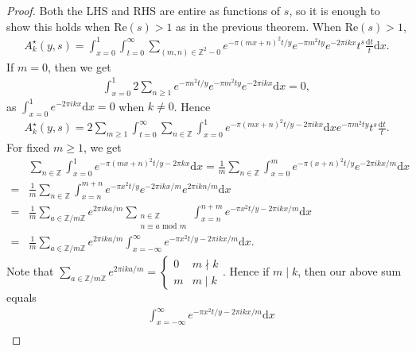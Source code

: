 \documentclass{article}
\theoremstyle{definition}
\begin{document}
\begin{proof}
    Both the LHS and RHS are entire as functions of $s$, so it is enough to show this holds when $\text{Re}(s)>1$ as in the previous theorem. When $\text{Re}(s)>1$, \begin{align*}
        A_k^{\star}(y,s) = \int_{x=0}^{1} \int_{t=0}^{\infty} \sum_{(m,n) \in \mathbb{Z}^2-0}^{} e^{-\pi(mx+n)^2 t/y}e^{-\pi m^2 t y} e^{-2\pi i k x}t^s \frac{\mathrm{d}t}{t}\mathrm{d}x.
    \end{align*}
    If $m=0$, then we get
    \begin{align*}
        \int_{x=0}^{1} 2\sum_{n\ge 1}^{} e^{-\pi n^2 t/y}e^{-\pi m^2 t y}e^{-2\pi i k x}\mathrm{d}x = 0,
    \end{align*}
    as $\int_{x=0}^{1} e^{-2 \pi i k x}\mathrm{d}x = 0$ when $k \neq 0$. Hence
    \begin{align*}
        A_k^{\star}(y,s) = 2 \sum_{m\ge 1}^{} \int_{t=0}^{\infty} \sum_{n \in \mathbb{Z}}^{} \int_{x=0}^{1} e^{-\pi(mx+n)^2 t/y - 2\pi i k x}\mathrm{d}x e^{-\pi m^2 t y}t^s \frac{\mathrm{d}t}{t}.
    \end{align*}
    For fixed $m\ge 1$, we get 
    \begin{align*}
        &\sum_{n \in \mathbb{Z}}^{} \int_{x=0}^{1} e^{-\pi (mx + n)^2 t/y - 2\pi kx}\mathrm{d}x = \frac{1}{m}\sum_{n  \in \mathbb{Z}}^{} \int_{x=0}^{m} e^{-\pi (x+n)^2 t/y}e^{-2\pi i k x/m}\mathrm{d}x \\ 
        =& \frac{1}{m}\sum_{ n \in \mathbb{Z}}^{} \int_{x=n}^{m+n} e^{-\pi x^2 t/y}e^{-2\pi i k x/m}e^{2\pi i k n/m}\mathrm{d}x \\
        =& \frac{1}{m}\sum_{a \in \mathbb{Z}/m\mathbb{Z}}^{} e^{2\pi i k a / m}\sum_{\substack{n \in \mathbb{Z} \\ n \equiv a \text{ mod }m}}^{} \int_{x = n}^{n+m}e^{-\pi x^2 t/y-2\pi i k x/m} \mathrm{d}x \\
        =& \frac{1}{m}\sum_{a \in \mathbb{Z}/m\mathbb{Z}}^{} e^{2\pi i k a /m} \int_{x=-\infty}^{\infty} e^{-\pi x^2 t/y - 2\pi i k x/m} \mathrm{d}x.
    \end{align*}
    Note that $\sum_{a \in \mathbb{Z}/m\mathbb{Z}}^{} e^{2\pi i k a /m} = \begin{cases}
        0 & m \nmid k \\
        m & m \mid k
    \end{cases}$. Hence if $m \mid k$, then our above sum equals
    \begin{align*}
         &\int_{x=-\infty}^{\infty} e^{-\pi x^2 t/y - 2\pi i k x / m}\mathrm{d}x \\

\end{align*}
\end{proof}
\end{document}
